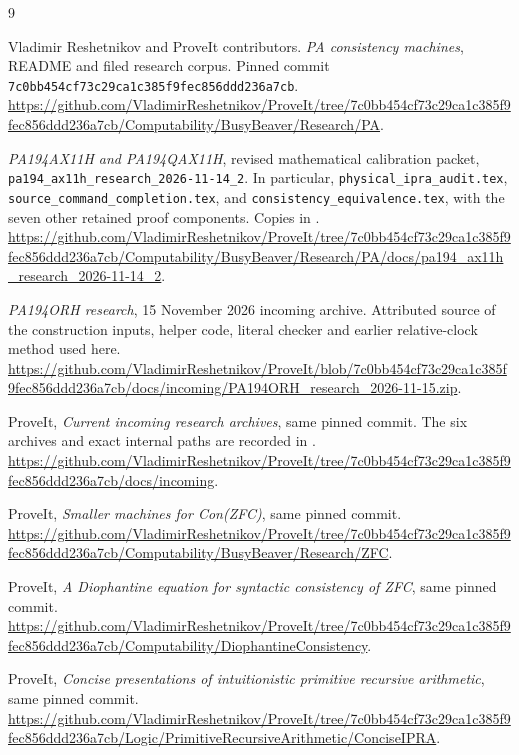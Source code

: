 \documentclass[10pt,a4paper]{article}
\theoremstyle{definition}
\begin{document}
\clearpage
\begin{thebibliography}{9}
\raggedright
{}
Vladimir Reshetnikov and ProveIt contributors.
\emph{PA consistency machines}, README and filed research corpus.
Pinned commit \texttt{7c0bb454cf73c29ca1c385f9fec856ddd236a7cb}.
\url{https://github.com/VladimirReshetnikov/ProveIt/tree/7c0bb454cf73c29ca1c385f9fec856ddd236a7cb/Computability/BusyBeaver/Research/PA}.

\emph{PA194AX11H and PA194QAX11H}, revised mathematical calibration packet,
\texttt{pa194\_ax11h\_research\_2026-11-14\_2}.
In particular, \texttt{physical\_ipra\_audit.tex},
\texttt{source\_command\_completion.tex}, and
\texttt{consistency\_equivalence.tex}, with the seven other retained proof
components. Copies in .
\url{https://github.com/VladimirReshetnikov/ProveIt/tree/7c0bb454cf73c29ca1c385f9fec856ddd236a7cb/Computability/BusyBeaver/Research/PA/docs/pa194_ax11h_research_2026-11-14_2}.

\emph{PA194ORH research}, 15 November 2026 incoming archive.
Attributed source of the construction inputs, helper code, literal
checker and earlier relative-clock method used here.
\url{https://github.com/VladimirReshetnikov/ProveIt/blob/7c0bb454cf73c29ca1c385f9fec856ddd236a7cb/docs/incoming/PA194ORH_research_2026-11-15.zip}.

ProveIt, \emph{Current incoming research archives}, same pinned commit.
The six archives and exact internal paths are recorded in
.
\url{https://github.com/VladimirReshetnikov/ProveIt/tree/7c0bb454cf73c29ca1c385f9fec856ddd236a7cb/docs/incoming}.

ProveIt, \emph{Smaller machines for Con(ZFC)}, same pinned commit.
\url{https://github.com/VladimirReshetnikov/ProveIt/tree/7c0bb454cf73c29ca1c385f9fec856ddd236a7cb/Computability/BusyBeaver/Research/ZFC}.

ProveIt, \emph{A Diophantine equation for syntactic consistency of ZFC},
same pinned commit.
\url{https://github.com/VladimirReshetnikov/ProveIt/tree/7c0bb454cf73c29ca1c385f9fec856ddd236a7cb/Computability/DiophantineConsistency}.

ProveIt, \emph{Concise presentations of intuitionistic primitive recursive
arithmetic}, same pinned commit.
\url{https://github.com/VladimirReshetnikov/ProveIt/tree/7c0bb454cf73c29ca1c385f9fec856ddd236a7cb/Logic/PrimitiveRecursiveArithmetic/ConciseIPRA}.
\end{thebibliography}
\end{document}
